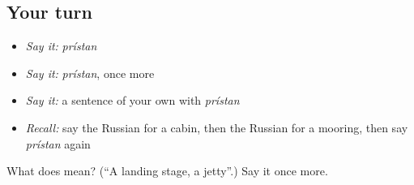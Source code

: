 \subsection*{Your turn}
\begin{itemize}
\raggedright
  \item \emph{Say it:} \emph{prístan}
  \item \emph{Say it:} \emph{prístan}, once more
  \item \emph{Say it:} a sentence of your own with \emph{prístan}
  \item \emph{Recall:} say the Russian for a cabin, then the Russian for a mooring, then say \emph{prístan} again
\end{itemize}

\begin{tcolorbox}[breakable,colback=teal!4,colframe=teal!35!black,title={Before you move on}]
What does  mean? (\textquotedblleft{}A landing stage, a jetty\textquotedblright{}.) Say it once more.
\end{tcolorbox}
